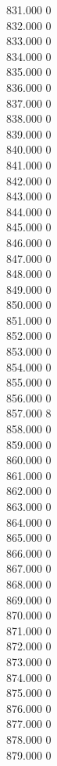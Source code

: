 { 831.000	0 \\
 832.000	0 \\
 833.000	0 \\
 834.000	0 \\
 835.000	0 \\
 836.000	0 \\
 837.000	0 \\
 838.000	0 \\
 839.000	0 \\
 840.000	0 \\
 841.000	0 \\
 842.000	0 \\
 843.000	0 \\
 844.000	0 \\
 845.000	0 \\
 846.000	0 \\
 847.000	0 \\
 848.000	0 \\
 849.000	0 \\
 850.000	0 \\
 851.000	0 \\
 852.000	0 \\
 853.000	0 \\
 854.000	0 \\
 855.000	0 \\
 856.000	0 \\
 857.000	8 \\
 858.000	0 \\
 859.000	0 \\
 860.000	0 \\
 861.000	0 \\
 862.000	0 \\
 863.000	0 \\
 864.000	0 \\
 865.000	0 \\
 866.000	0 \\
 867.000	0 \\
 868.000	0 \\
 869.000	0 \\
 870.000	0 \\
 871.000	0 \\
 872.000	0 \\
 873.000	0 \\
 874.000	0 \\
 875.000	0 \\
 876.000	0 \\
 877.000	0 \\
 878.000	0 \\
 879.000	0 \\
}
